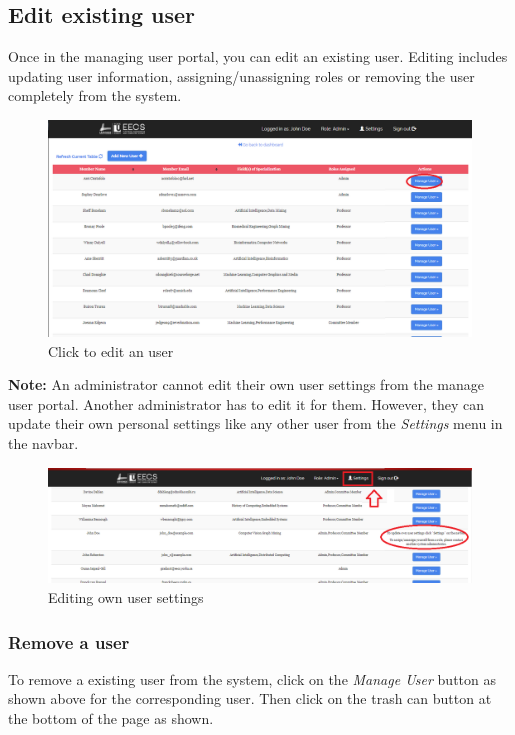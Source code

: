 \documentclass[fontsize=12pt,paper=letter,twoside]{scrartcl}
\begin{document}
\clearpage
\subsection{Edit existing user}
Once in the managing user portal, you can edit an existing user. Editing includes updating user information, assigning/unassigning roles or removing the user completely from the system.

\begin{figure}[!htb]
\begin{center}
\includegraphics[width=.99\textwidth]{images/mu/edit_user.png}
\end{center}
\caption{Click to edit an user}
\label{fig:edit_user}
\end{figure}

\smallskip
\noindent \textbf{Note:} An administrator cannot edit their own user settings from the manage user portal. Another administrator has to edit it for them. However, they can update their own personal settings like any other user from the \emph{Settings} menu in the navbar. 

\begin{figure}[!htb]
\begin{center}
\includegraphics[width=.99\textwidth]{images/mu/edit_own_user.png}
\end{center}
\caption{Editing own user settings}
\label{fig:edit_own_user}
\end{figure}

\clearpage
\subsubsection{Remove a user}
To remove a existing user from the system, click on the \emph{Manage User} button as shown above for the corresponding user. Then click on the trash can button at the bottom of the page as shown.
\end{document}
